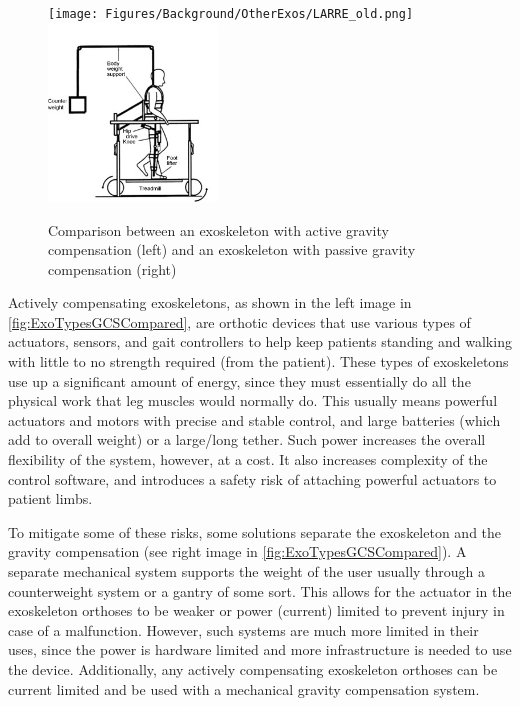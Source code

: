 \begin{figure}[ht!]
    \centering
    \texttt{[image: Figures/Background/OtherExos/LARRE\_old.png]}
    \hspace*{10mm}
    \includegraphics[width=0.4\textwidth]{Figures/Background/ExoSeparateGravityComp.png}
    \caption{Comparison between an exoskeleton with active gravity compensation (left) and an exoskeleton with passive gravity compensation (right) \cite{GaitTrainingClinical}}
    \label{fig:ExoTypesGCSCompared}
\end{figure}

Actively compensating exoskeletons, as shown in the left image in \autoref{fig:ExoTypesGCSCompared}, are orthotic devices that use various types of actuators, sensors, and gait controllers to help keep patients standing and walking with little to no strength required (from the patient). These types of exoskeletons use up a significant amount of energy, since they must essentially do all the physical work that leg muscles would normally do. This usually means powerful actuators and motors with precise and stable control, and large batteries (which add to overall weight) or a large/long tether. Such power increases the overall flexibility of the system, however, at a cost. It also increases complexity of the control software, and introduces a safety risk of attaching powerful actuators to patient limbs.

To mitigate some of these risks, some solutions separate the exoskeleton and the gravity compensation (see right image in \autoref{fig:ExoTypesGCSCompared}). A separate mechanical system supports the weight of the user usually through a counterweight system or a gantry of some sort. This allows for the actuator in the exoskeleton orthoses to be weaker or power (current) limited to prevent injury in case of a malfunction. However, such systems are much more limited in their uses, since the power is hardware limited and more infrastructure is needed to use the device. Additionally, any actively compensating exoskeleton orthoses can be current limited and be used with a mechanical gravity compensation system. 

